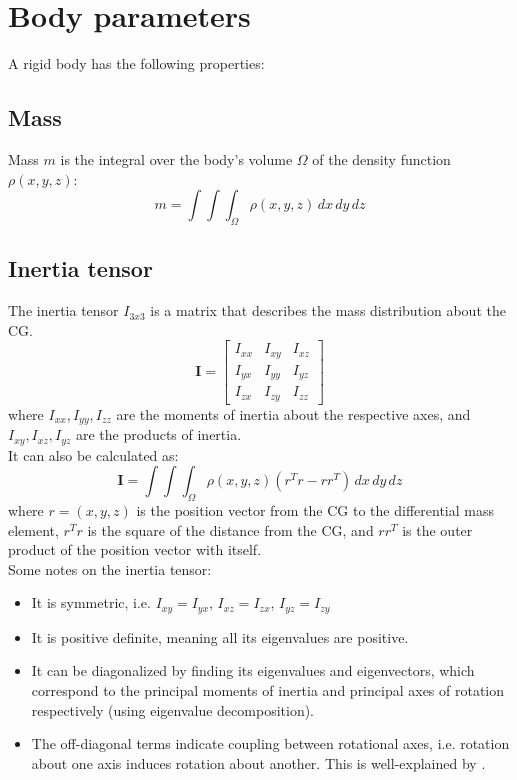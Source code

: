 \documentclass[a4paper,12pt]{article}
\begin{document}
\section{Body parameters}
A rigid body has the following properties:


\subsection{Mass}
Mass \( m \) is the integral over the body's volume \( \Omega \) of the density function \( \rho(x,y,z) \):
\begin{equation} \nonumber
    m = \int\int\int_\Omega \rho(x,y,z) \, dx \, dy \, dz
\end{equation}


\subsection{Inertia tensor}
The inertia tensor \(I_{3x3}\) is a matrix that describes the mass distribution about the CG.
\begin{equation} \nonumber
    \mathbf{I} = \begin{bmatrix}
        I_{xx} & I_{xy} & I_{xz} \\
        I_{yx} & I_{yy} & I_{yz} \\
        I_{zx} & I_{zy} & I_{zz}
    \end{bmatrix}
\end{equation}
where \( I_{xx}, I_{yy}, I_{zz} \) are the moments of inertia about the respective axes, and \( I_{xy}, I_{xz}, I_{yz} \) are the products of inertia. \\
It can also be calculated as:
\begin{equation} \nonumber
    \mathbf{I} = \int\int\int_\Omega \rho(x,y,z)
    (r^Tr-rr^T) \, dx \, dy \, dz
\end{equation}
where \( r = (x, y, z)\) is the position vector from the CG to the differential mass element, \(r^Tr\) is the square of the distance from the CG, and \(rr^T\) is the outer product of the position vector with itself. \\
Some notes on the inertia tensor:
\begin{itemize}
    \item It is symmetric, i.e. \( I_{xy} = I_{yx} \), \( I_{xz} = I_{zx} \), \( I_{yz} = I_{zy} \)
    \item It is positive definite, meaning all its eigenvalues are positive.
    \item It can be diagonalized by finding its eigenvalues and eigenvectors, which correspond to the principal moments of inertia and principal axes of rotation respectively (using eigenvalue decomposition).
    \item
          The off-diagonal terms indicate coupling between rotational axes, i.e. rotation about one axis induces rotation about another. This is well-explained by \cite{veritasium01}.
\end{itemize}
\end{document}
